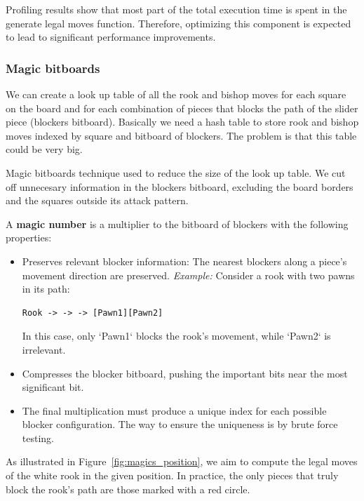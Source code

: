 \noindent Profiling results show that most part of the total execution time is spent in the generate legal moves function. Therefore, optimizing this component is expected to lead to significant performance improvements.

\subsubsection{Magic bitboards}

We can create a look up table of all the rook and bishop moves for each square on the board and for each combination of pieces that blocks the path of the slider piece (blockers  bitboard). Basically we need a hash table to store rook and bishop moves indexed by square and bitboard of blockers. The problem is that this table could be very big.~\cite{MagicBitboards}

\vspace{1em}

\noindent Magic bitboards technique used to reduce the size of the look up table. We cut off unnecesary information in the blockers bitboard, excluding the board borders and the squares outside its attack pattern.

\vspace{1em}

A \textbf{magic number} is a multiplier to the bitboard of blockers with the following properties:

\begin{itemize}
  \item Preserves relevant blocker information: 
  The nearest blockers along a piece's movement direction are preserved. 
  \textit{Example:} Consider a rook with two pawns in its path:
  \begin{lstlisting}[breaklines=true]
    Rook -> -> -> [Pawn1][Pawn2]
  \end{lstlisting}
  In this case, only `Pawn1` blocks the rook's movement, while `Pawn2` is irrelevant.
  \item Compresses the blocker bitboard, pushing the important bits near the most significant bit.
  \item The final multiplication must produce a unique index for each possible blocker configuration. The way to ensure the uniqueness is by brute force testing.
\end{itemize}

\noindent As illustrated in Figure~\ref{fig:magics_position}, we aim to compute the legal moves of the white rook in the given position. In practice, the only pieces that truly block the rook's path are those marked with a red circle.

